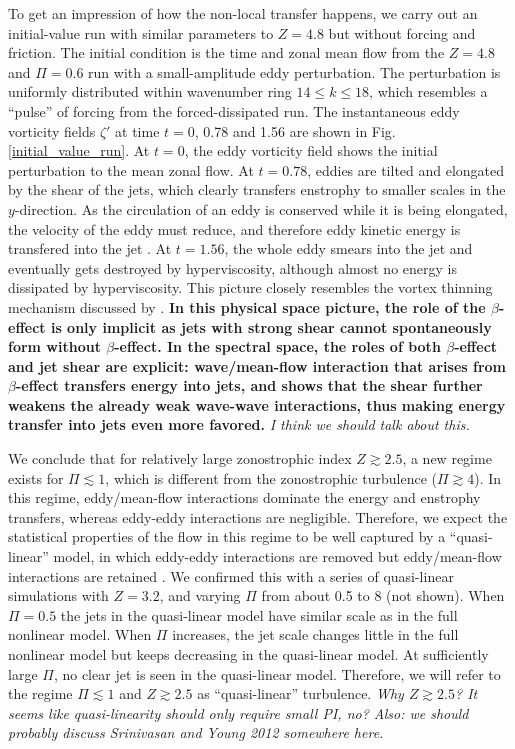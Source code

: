 \documentclass{jfm}
\begin{document}
To get an impression of how the non-local transfer happens, we carry
out an initial-value run with similar parameters to $Z=4.8$ but without
forcing and friction. The initial condition is the time and zonal mean
flow from the $Z=4.8$ and $\Pi=0.6$ run with a small-amplitude eddy
perturbation. The perturbation is uniformly distributed within
wavenumber ring $14\leq k\leq18$, which resembles a ``pulse'' of
forcing from the forced-dissipated run. The instantaneous eddy vorticity fields $\zeta'$ at
time $t=0$, 0.78 and 1.56 are shown in Fig. \ref{initial_value_run}.
At $t=0$, the eddy vorticity field shows the initial perturbation to the
mean zonal flow. At $t=0.78$, eddies are tilted and elongated by the shear
of the jets, which clearly transfers enstrophy to smaller scales in the
$y$-direction. As the circulation of an eddy is conserved while it
is being elongated, the velocity of the eddy must reduce, and therefore
eddy kinetic energy is transfered into the jet \citep{Kraichnan1976}.
At $t=1.56$, the whole eddy smears into the jet and eventually
gets destroyed by hyperviscosity, although almost no energy is dissipated
by hyperviscosity. This picture closely resembles the vortex thinning
mechanism discussed by \citet{Manz2009}. \textbf{In this physical space picture,
the role of the $\beta$-effect is only implicit as jets with strong shear
cannot spontaneously form without $\beta$-effect. In the
spectral space, the roles of both $\beta$-effect and jet shear are explicit: 
wave/mean-flow interaction that arises from $\beta$-effect transfers 
energy into jets, and \citet{Gurcan2012} shows that the shear further 
weakens the already weak wave-wave interactions, thus making energy 
transfer into jets even more favored.} \textit{I think we should talk about this.}

We conclude that for relatively large zonostrophic index $Z\apprge2.5$,
a new regime exists for $\Pi\apprle1$, which is different from the
zonostrophic turbulence ($\Pi\apprge4$). In this regime, eddy/mean-flow
interactions dominate the energy and enstrophy transfers, whereas eddy-eddy
interactions are negligible. Therefore, we expect the statistical
properties of the flow in this regime to be well captured by a ``quasi-linear''
model, in which eddy-eddy interactions are removed but eddy/mean-flow
interactions are retained \citep{O'Gorman2007,Tobias2013}. We confirmed this 
with a series of quasi-linear simulations with $Z=3.2$, and varying $\Pi$
from about 0.5 to 8 (not shown). When $\Pi=0.5$ the jets in the
quasi-linear model have similar scale as in the full nonlinear
model. When $\Pi$ increases, the jet scale changes little in the
full nonlinear model but keeps decreasing in the quasi-linear model.
At sufficiently large $\Pi$, no clear jet is seen in the quasi-linear
model. Therefore, we will refer to the regime $\Pi\apprle1$ and $Z\apprge2.5$
as ``quasi-linear'' turbulence. \textit{Why $Z\apprge2.5$? It seems like quasi-linearity
should only require small PI, no? Also: we should probably discuss Srinivasan and Young 2012
somewhere here.}
\end{document}
